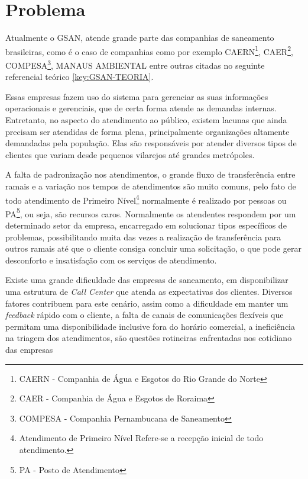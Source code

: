 \section*{Problema}

Atualmente o GSAN, atende grande parte das companhias de saneamento brasileiras, como é o caso de companhias como por exemplo CAERN\footnote{CAERN - Companhia de Água e Esgotos do Rio Grande do Norte}, CAER\footnote{CAER - Companhia de Água e Esgotos de Roraima}, COMPESA\footnote{COMPESA - Companhia Pernambucana de Saneamento}, MANAUS AMBIENTAL entre outras citadas no seguinte referencial teórico \ref{key:GSAN-TEORIA}.

Essas empresas fazem uso do sistema para gerenciar as suas informações operacionais e gerenciais, que de certa forma atende as demandas internas. Entretanto, no aspecto do atendimento ao público, existem lacunas que ainda precisam ser atendidas de forma plena, principalmente organizações altamente demandadas pela população. Elas são responsáveis por atender diversos tipos de clientes que variam desde pequenos vilarejos até grandes metrópoles.

A falta de padronização nos atendimentos, o grande fluxo de transferência entre ramais e a variação nos tempos de atendimentos são muito comuns, pelo fato de todo atendimento de Primeiro Nível\footnote{Atendimento de Primeiro Nível Refere-se a recepção inicial de todo atendimento.} normalmente é realizado por pessoas ou PA\footnote{PA - Posto de Atendimento}, ou seja, são recursos caros. Normalmente os atendentes respondem por um determinado setor da empresa, encarregado em solucionar tipos específicos de problemas, possibilitando muita das vezes a realização de transferência para outros ramais até que o cliente consiga concluir uma solicitação, o que pode gerar desconforto e insatisfação com os serviços de atendimento.
	
Existe uma grande dificuldade das empresas de saneamento, em disponibilizar uma estrutura de \textit{Call Center} que atenda as expectativas dos clientes.
Diversos fatores contribuem para este cenário, assim como a dificuldade em manter um \textit{feedback} rápido com o cliente, a falta de canais de comunicações flexíveis que permitam uma disponibilidade inclusive fora do horário comercial, a ineficiência na triagem dos atendimentos, são questões rotineiras enfrentadas nos cotidiano das empresas
